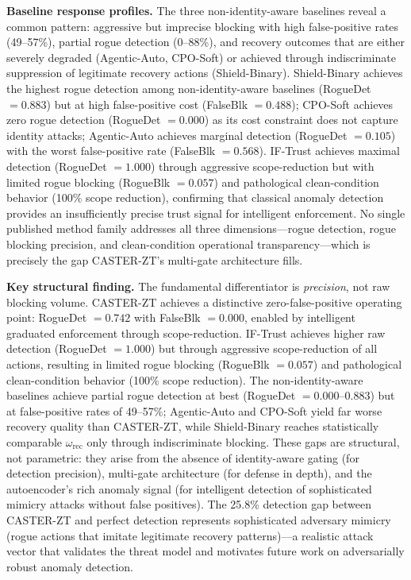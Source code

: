 \documentclass[10pt,journal,compsoc]{IEEEtran}
\begin{document}
\noindent\textbf{Baseline response profiles.}
The three non-identity-aware baselines reveal a common pattern: aggressive but imprecise blocking with high false-positive rates (49--57\%), partial rogue detection (0--88\%), and recovery outcomes that are either severely degraded (Agentic-Auto, CPO-Soft) or achieved through indiscriminate suppression of legitimate recovery actions (Shield-Binary).
Shield-Binary achieves the highest rogue detection among non-identity-aware baselines (RogueDet $= 0.883$) but at high false-positive cost (FalseBlk $= 0.488$); CPO-Soft achieves zero rogue detection (RogueDet $= 0.000$) as its cost constraint does not capture identity attacks; Agentic-Auto achieves marginal detection (RogueDet $= 0.105$) with the worst false-positive rate (FalseBlk $= 0.568$).
IF-Trust achieves maximal detection (RogueDet $= 1.000$) through aggressive scope-reduction but with limited rogue blocking (RogueBlk $= 0.057$) and pathological clean-condition behavior (100\% scope reduction), confirming that classical anomaly detection provides an insufficiently precise trust signal for intelligent enforcement.
No single published method family addresses all three dimensions---rogue detection, rogue blocking precision, and clean-condition operational transparency---which is precisely the gap CASTER-ZT's multi-gate architecture fills.

\noindent\textbf{Key structural finding.}
The fundamental differentiator is \emph{precision}, not raw blocking volume.
CASTER-ZT achieves a distinctive zero-false-positive operating point: RogueDet $= 0.742$ with FalseBlk $= 0.000$, enabled by intelligent graduated enforcement through scope-reduction.
IF-Trust achieves higher raw detection (RogueDet $= 1.000$) but through aggressive scope-reduction of all actions, resulting in limited rogue blocking (RogueBlk $= 0.057$) and pathological clean-condition behavior (100\% scope reduction).
The non-identity-aware baselines achieve partial rogue detection at best (RogueDet $= 0.000$--$0.883$) but at false-positive rates of 49--57\%; Agentic-Auto and CPO-Soft yield far worse recovery quality than CASTER-ZT, while Shield-Binary reaches statistically comparable $\omega_{\mathrm{rec}}$ only through indiscriminate blocking.
These gaps are structural, not parametric: they arise from the absence of identity-aware gating (for detection precision), multi-gate architecture (for defense in depth), and the autoencoder's rich anomaly signal (for intelligent detection of sophisticated mimicry attacks without false positives).
The 25.8\% detection gap between CASTER-ZT and perfect detection represents sophisticated adversary mimicry (rogue actions that imitate legitimate recovery patterns)---a realistic attack vector that validates the threat model and motivates future work on adversarially robust anomaly detection.
\end{document}
